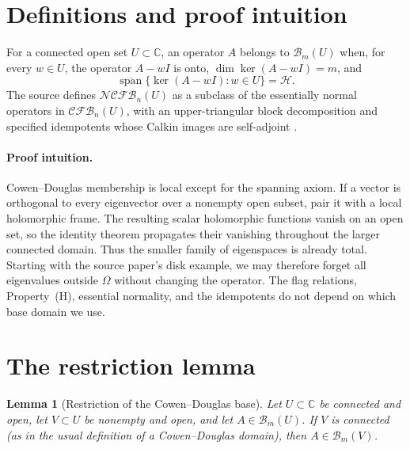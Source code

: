 \documentclass[11pt]{article}
\newtheorem{lemma}[theorem]{Lemma}
\newcommand{\Bclass}{\mathcal B}
\newcommand{\NCFB}{\mathcal{NCFB}}
\newcommand{\CFB}{\mathcal{CFB}}
\begin{document}
\section{Definitions and proof intuition}

For a connected open set $U\subset\mathbb C$, an operator $A$ belongs to
$\Bclass_m(U)$ when, for every $w\in U$, the operator $A-wI$ is onto,
$\dim\ker(A-wI)=m$, and
\[
 \overline{\operatorname{span}}\{\ker(A-wI):w\in U\}=\mathcal H.
\]
The source defines $\NCFB_n(U)$ as a subclass of the essentially normal
operators in $\CFB_n(U)$, with an upper-triangular block decomposition and
specified idempotents whose Calkin images are self-adjoint \cite{JJW}.

\paragraph{Proof intuition.}
Cowen--Douglas membership is local except for the spanning axiom.  If a vector
is orthogonal to every eigenvector over a nonempty open subset, pair it with a
local holomorphic frame.  The resulting scalar holomorphic functions vanish
on an open set, so the identity theorem propagates their vanishing throughout
the larger connected domain.  Thus the smaller family of eigenspaces is
already total.  Starting with the source paper's disk example, we may
therefore forget all eigenvalues outside $\Omega$ without changing the
operator.  The flag relations, Property~(H), essential normality, and the
idempotents do not depend on which base domain we use.

\section{The restriction lemma}

\begin{lemma}[Restriction of the Cowen--Douglas base]
\label{lem:restriction}
Let $U\subset\mathbb C$ be connected and open, let $V\subset U$ be nonempty
and open, and let $A\in\Bclass_m(U)$.  If $V$ is connected (as in the usual
definition of a Cowen--Douglas domain), then $A\in\Bclass_m(V)$.
\end{lemma}
\end{document}
